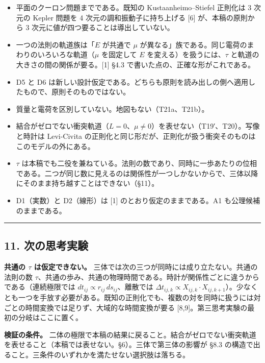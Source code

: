 \documentclass[
  a4paper,
]{ltjsarticle}
\providecommand{\tightlist}{%
  \setlength{\itemsep}{0pt}\setlength{\parskip}{0pt}}
\begin{document}
\begin{itemize}
\tightlist
\item
  平面のクーロン問題までである。既知の Kustaanheimo--Stiefel 正則化は 3
  次元の Kepler 問題を 4 次元の調和振動子に持ち上げる {[}6{]}
  が、本稿の原則から 3 次元に値が四つ要ることは導出していない。
\item
  一つの法則の軌道族は「\(E\) が共通で \(\mu\)
  が異なる」族である。同じ電荷のまわりのいろいろな軌道（\(\mu\)
  を固定して \(E\) を変える）を扱うには、\(\tau\)
  と軌道の大きさの間の関係が要る。{[}1{]} §4.3
  で書いた点の、正確な形がこれである。
\item
  D5 と D6
  は新しい設計仮定である。どちらも原則を読み出しの側へ適用したもので、原則そのものではない。
\item
  質量と電荷を区別していない。地図もない（T21a、T21b）。
\item
  結合がゼロでない衝突軌道（\(L=0\)、\(\mu\neq0\)）を表せない（T19′、T20）。写像と時計は
  Levi-Civita
  の正則化と同じ形だが、正則化が扱う衝突そのものはこのモデルの外にある。
\item
  \(\tau\)
  は本稿でも二役を兼ねている。法則の数であり、同時に一歩あたりの位相である。二つが同じ数に見えるのは関係性が一つしかないからで、三体以降にそのまま持ち越すことはできない（§11）。
\item
  D1（実数）と D2（線形）は {[}1{]} のとおり仮定のままである。A1
  も公理候補のままである。
\end{itemize}

\begin{center}\rule{0.5\linewidth}{0.5pt}\end{center}

\subsection{11.
次の思考実験}\label{ux6b21ux306eux601dux8003ux5b9fux9a13}

\textbf{共通の \(\tau\) は仮定できない。}
三体では次の三つが同時には成り立たない。共通の法則の数
\(\tau\)、共通の歩み、共通の物理時間である。時計が関係性ごとに違うからである（連続極限では
\(dt_{ij}\propto r_{ij}\,ds_{ij}\)、離散では
\(\Delta t_{ij,k}\propto X_{ij,k}\cdot X_{ij,k+1}\)）。少なくとも一つを手放す必要がある。既知の正則化でも、複数の対を同時に扱うには対ごとの時間変換では足りず、大域的な時間変換が要る
{[}8,9{]}。第三思考実験の最初の分岐はここに置く。

\textbf{検証の条件。}
二体の極限で本稿の結果に戻ること。結合がゼロでない衝突軌道を表せること（本稿では表せない。§6）。三体で第三体の影響が
§8.3 の構造で出ること。三条件のいずれかを満たせない選択肢は落ちる。
\end{document}

